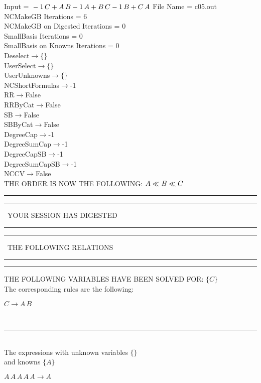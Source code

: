 \documentclass[rep10,leqno]{report}
\begin{document}
\normalsize
\baselineskip=12pt
\noindent
Input = 
$
\\-1\,
 C + A\,
 B\\
-1\,
 A + B\,
 C\\
-1\,
 B + C\,
 A\\
$
File Name = c05.out\\
NCMakeGB Iterations = 6\\
NCMakeGB on Digested Iterations = 0\\
SmallBasis Iterations = 0\\
SmallBasis on Knowns Iterations = 0\\
Deselect$\rightarrow \{\}$\\
UserSelect$\rightarrow \{\}$\\
UserUnknowns$\rightarrow \{\}$\\
NCShortFormulas$\rightarrow$-1\\
RR$\rightarrow $False\\
RRByCat$\rightarrow $False\\
SB$\rightarrow $False\\
SBByCat$\rightarrow $False\\
DegreeCap$\rightarrow $-1\\
DegreeSumCap$\rightarrow $-1\\
DegreeCapSB$\rightarrow $-1\\
DegreeSumCapSB$\rightarrow $-1\\
NCCV$\rightarrow $False\\
THE ORDER IS NOW THE FOLLOWING:\hfil\break
$
A\ll
B\ll
C\\
$
\rule[2pt]{6in}{4pt}\hfil\break
\rule[2pt]{1.879in}{4pt}
\ YOUR SESSION HAS DIGESTED\ 
\rule[2pt]{1.879in}{4pt}\hfil\break
\rule[2pt]{1.923in}{4pt}
\ THE FOLLOWING RELATIONS\ 
\rule[2pt]{1.923in}{4pt}\hfil\break
\rule[2pt]{6in}{4pt}\hfil\break
THE FOLLOWING VARIABLES HAVE BEEN SOLVED FOR:\hfil\break
$\{C\}$
\smallskip\\
The corresponding rules are the following:\smallskip\\
\begin{minipage}{6in}
$
C\rightarrow A\,
 B
$
\end{minipage}\medskip\\
\rule[3pt]{6in}{.7pt}\\
The expressions with unknown variables $\{\}$\\
and knowns $\{A\}$\smallskip\\
\begin{minipage}{6in}
$
A\,
 A\,
 A\,
 A\,
 A\rightarrow A
$
\end{minipage}\\
\end{document}
